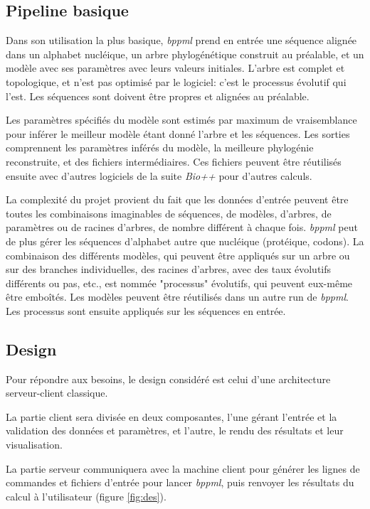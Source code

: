 \subsection{Pipeline basique}

Dans son utilisation la plus basique,
\textit{bppml} prend en entrée une séquence alignée dans un alphabet nucléique,
un arbre phylogénétique construit au préalable,
et un modèle avec ses paramètres
avec leurs valeurs initiales.
L'arbre est complet et topologique,
et n'est pas optimisé par le logiciel:
c'est le processus évolutif qui l'est.
Les séquences sont doivent être propres et alignées au préalable.

Les paramètres spécifiés du modèle sont estimés par maximum de vraisemblance
pour inférer le meilleur modèle étant donné l'arbre et les séquences.
Les sorties comprennent les paramètres inférés du modèle,
la meilleure phylogénie reconstruite,
et des fichiers intermédiaires.
Ces fichiers peuvent être réutilisés ensuite
avec d'autres logiciels de la suite \textit{Bio++}
pour d'autres calculs.

La complexité du projet provient du fait que les données d'entrée
peuvent être toutes les combinaisons imaginables
de séquences, de modèles, d'arbres, de paramètres ou de racines d'arbres,
de nombre différent à chaque fois.
\textit{bppml} peut de plus gérer les séquences d'alphabet autre que nucléique (protéique, codons).
La combinaison des différents modèles,
qui peuvent être appliqués sur un arbre ou sur des branches individuelles,
des racines d'arbres,
avec des taux évolutifs différents ou pas, etc.,
est nommée "processus" évolutifs,
qui peuvent eux-même être emboîtés.
Les modèles peuvent être réutilisés
dans un autre run de \textit{bppml}.
Les processus sont ensuite appliqués sur les séquences en entrée.


\subsection{Design}

Pour répondre aux besoins,
le design considéré est celui d'une architecture serveur-client classique.

La partie client sera divisée en deux composantes,
l'une gérant l'entrée et la validation des données et paramètres,
et l'autre, le rendu des résultats et leur visualisation.

La partie serveur communiquera avec la machine client
pour générer les lignes de commandes et fichiers d'entrée
pour lancer \textit{bppml},
puis renvoyer les résultats du calcul à l'utilisateur (figure \ref{fig:des}).

